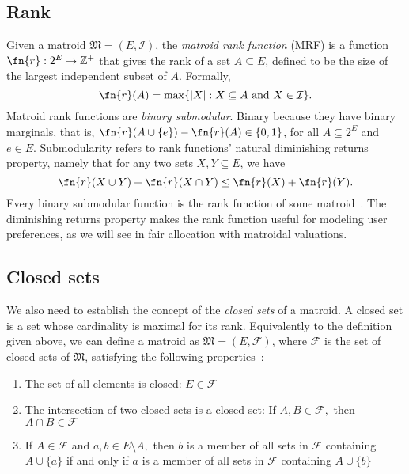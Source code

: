 \subsection*{Rank}
Given a matroid $\mathfrak{M} = (E, \mathcal{I})$, the \textit{matroid rank function} (MRF) is a function $\fn{r} : 2^E \to \mathbb{Z}^+$ that gives the rank of a set $ A \subseteq E$, defined to be the size of the largest independent subset of $A$. Formally, $$\fn{r}(A) = \max\{|X| : X \subseteq A \text{ and } X \in \mathcal{I}\}.$$ Matroid rank functions are \textit{binary submodular}. Binary because they have binary marginals, that is, $\fn{r}(A \cup \{ e \}) - \fn{r}(A) \in \{0,1\}$, for all $A \subseteq 2^E$ and $e \in E$. Submodularity refers to rank functions' natural diminishing returns property, namely that for any two sets $X, Y \subseteq E$, we have $$\fn{r}(X \cup Y) + \fn{r}(X \cap Y) \leq \fn{r}(X) + \fn{r}(Y).$$ Every binary submodular function is the rank function of some matroid~\cite{schrijver-2003}. The diminishing returns property makes the rank function useful for modeling user preferences, as we will see in fair allocation with matroidal valuations.

\subsection*{Closed sets}

We also need to establish the concept of the \textit{closed sets} of a matroid. A closed set is a set whose cardinality is maximal for its rank. Equivalently to the definition given above, we can define a matroid as $\mathfrak{M} = (E, \mathcal{F})$, where $\mathcal{F}$ is the set of closed sets of $\mathfrak{M}$, satisfying the following properties~\cite{knuth-1975}:

\begin{enumerate}
  \item The set of all elements is closed: $E \in \mathcal{F}$
  \item The intersection of two closed sets is a closed set: If $A,B \in \mathcal{F},$ then $A \cap B \in \mathcal{F}$
  \item If $A \in \mathcal{F}$ and $a,b \in E \setminus A,$ then $b$ is a member of all sets in $\mathcal{F}$ containing $A \cup \{a\}$ if and only if $a$ is a member of all sets in $\mathcal{F}$ containing $A \cup \{b\}$
\end{enumerate}
